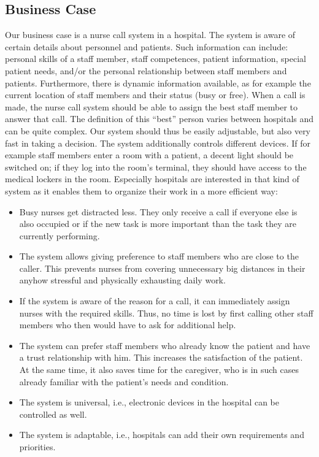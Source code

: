 \subsection{Business Case}\label{usecase}
Our business case is a nurse call system in a hospital.
The system is aware of certain details about personnel and patients.
Such information can include: personal skills of a staff member, staff competences, patient information, special patient needs, and/or the 
personal relationship between staff members and patients. %
Furthermore, there is dynamic information available, as for example the current location of staff members and their status (busy or free). 
When a call is made, the nurse
call system should be able to assign the best staff member to answer that call. The definition of this ``best'' person
varies between hospitals and can be quite complex. 
Our system should thus be easily adjustable, but also very fast in taking a decision.
The system additionally controls different devices. If for example staff members enter a room with a patient, 
a decent light should be switched on; if they log into the room's terminal, they should have access to the medical lockers in the room. 
%
Especially hospitals are interested in that kind of system as it enables them to organize their work 
in a more efficient way: 
\begin{itemize}
 \item Busy nurses get distracted less. They only receive a call if everyone else is also occupied or if the new task is more important than the task 
 they are currently performing.
 \item The system allows giving preference to staff members who are close to the caller. This prevents nurses from covering unnecessary big distances 
 in their anyhow stressful and physically exhausting 
 daily work.
 \item If the system is aware of the reason for a call, it can immediately assign nurses with the required skills. 
 Thus, no time is lost by first calling other staff members who then would have to ask for additional help.
 \item The system can prefer staff members who already know the patient and have a trust relationship with him. This increases the satisfaction of 
 the patient. At the same time, it also saves time for the caregiver, who is in such cases already familiar with the patient's needs and condition.
 \item The system is universal, i.e., electronic devices in the hospital can be controlled as well.
 \item The system is adaptable, i.e., hospitals can add their own requirements and priorities.
\end{itemize}

